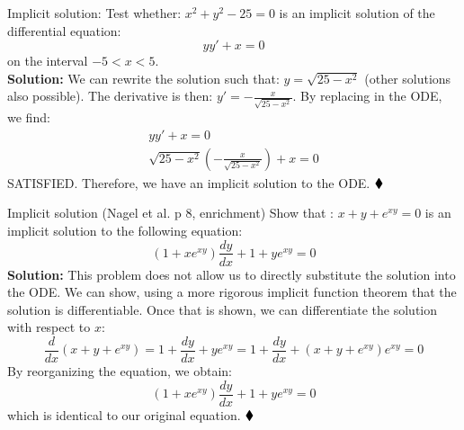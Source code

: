 \begin{exmp}{Implicit solution: }
Test whether: $x^2+y^2-25=0$ is an implicit solution of the differential equation:
\begin{equation}
yy'+x=0
\end{equation}
on the interval $-5<x<5$.\\
\textbf{Solution:} We can rewrite the solution such that: $y=\sqrt{25-x^2}$ (other solutions also possible). The derivative is then: $y'=-\frac{x}{\sqrt{25-x^2}}$. By replacing in the ODE, we find:
\begin{eqnarray}
yy'+x=0\\
\sqrt{25-x^2}\left(-\frac{x}{\sqrt{25-x^2}}\right)+x=0
\end{eqnarray}
SATISFIED. Therefore, we have an implicit solution to the ODE. $\mathbin{\blacklozenge}$
\end{exmp}


\begin{exmp}{Implicit solution (Nagel et al. p 8, enrichment) }
Show that : $x+y+e^{xy}=0$ is an implicit solution to the following equation:
\begin{equation}
(1+xe^{xy})\frac{dy}{dx}+1+ye^{xy}=0
\end{equation}
\textbf{Solution:} This problem does not allow us to directly substitute the solution into the ODE. We can show, using a more rigorous implicit function theorem that the solution is differentiable. Once that is shown, we can differentiate the solution with respect to $x$:
\begin{equation}
\frac{d}{dx}(x+y+e^{xy})=1+\frac{dy}{dx}+ye^{xy}=1+\frac{dy}{dx}+(x+y+e^{xy})e^{xy}=0
\end{equation}
By reorganizing the equation, we obtain:
\begin{equation}
(1+xe^{xy})\frac{dy}{dx}+1+ye^{xy}=0
\end{equation}
which is identical to our original equation.
 $\mathbin{\blacklozenge}$
\end{exmp}
\updateinfo[September 11, 2018]